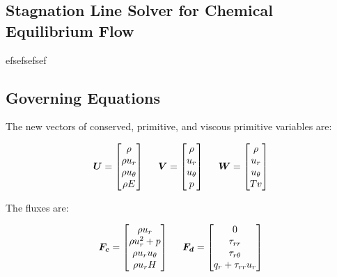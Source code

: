 \documentclass[10pt]{article}
\begin{document}
\begin{flushleft}

\section{Stagnation Line Solver for Chemical Equilibrium Flow}

efsefsefsef
\subsection{Governing Equations}

The new vectors of conserved, primitive, and viscous primitive variables are:

\begin{equation*}
    \boldsymbol{U} = \begin{bmatrix} 
    \rho \\ \rho u_r \\ \rho u_\theta \\ \rho E
    \end{bmatrix}
    \hspace{5mm}
    \boldsymbol{V} = \begin{bmatrix}
    \rho \\ u_r \\ u_\theta \\ p
    \end{bmatrix}
    \hspace{5mm}
    \boldsymbol{W} = \begin{bmatrix}
    \rho \\ u_r \\ u_\theta \\ Tv  
    \end{bmatrix}
\end{equation*}

The fluxes are:

\begin{equation}
    \boldsymbol{F_c} = \begin{bmatrix}
        \rho u_r\\
        \rho u_r^2 + p \\
        \rho u_r u_\theta \\
        \rho u_r H \\
    \end{bmatrix}
        \hspace{5mm} 
    \boldsymbol{F_d} = \begin{bmatrix}
        0 \\ 
        \tau_{rr} \\ 
        \tau_{r\theta} \\ 
        q_r + \tau_{rr} u_r \\ 
    \end{bmatrix}
\end{equation}


\end{flushleft}
\end{document}

